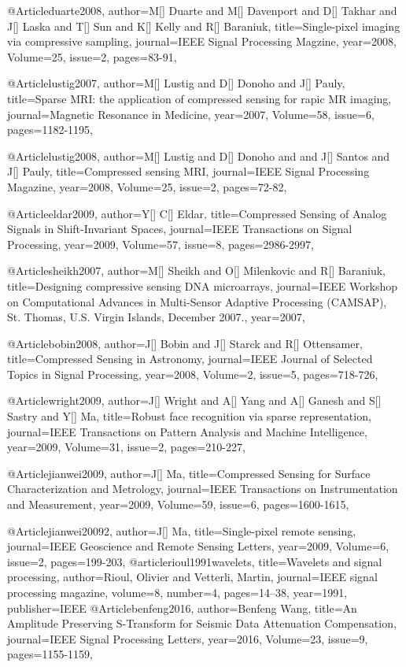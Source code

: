 @Article{duarte2008,
  author={M[] Duarte and M[] Davenport and D[] Takhar and J[] Laska and T[] Sun and K[] Kelly and R[] Baraniuk},
  title={Single-pixel imaging via compressive sampling},
  journal={IEEE Signal Processing Magzine},
  year=2008,
  Volume=25,
  issue=2,
  pages={83-91},
}

@Article{lustig2007,
  author={M[] Lustig and D[] Donoho and J[] Pauly},
  title={Sparse MRI: the application of compressed sensing for rapic MR imaging},
  journal={Magnetic Resonance in Medicine},
  year=2007,
  Volume=58,
  issue=6,
  pages={1182-1195},
}

@Article{lustig2008,
  author={M[] Lustig and D[] Donoho and and J[] Santos and J[] Pauly},
  title={Compressed sensing MRI},
  journal={IEEE Signal Processing Magazine},
  year=2008,
  Volume=25,
  issue=2,
  pages={72-82},
}

@Article{eldar2009,
  author={Y[] C[] Eldar},
  title={Compressed Sensing of Analog Signals in Shift-Invariant Spaces},
  journal={IEEE Transactions on Signal Processing},
  year=2009,
  Volume=57,
  issue=8,
  pages={2986-2997},
}

@Article{sheikh2007,
  author={M[] Sheikh and O[] Milenkovic and R[] Baraniuk},
  title={Designing compressive sensing DNA microarrays},
  journal={IEEE Workshop on Computational Advances in Multi-Sensor Adaptive
Processing (CAMSAP), St. Thomas, U.S. Virgin Islands, December 2007.},
  year=2007,
}

@Article{bobin2008,
  author={J[] Bobin and J[] Starck and R[] Ottensamer},
  title={Compressed Sensing in Astronomy},
  journal={IEEE Journal of Selected Topics in Signal Processing},
  year=2008,
  Volume=2,
  issue=5,
  pages={718-726},
}

@Article{wright2009,
  author={J[] Wright and A[] Yang and A[] Ganesh and S[] Sastry and Y[] Ma},
  title={Robust face recognition via sparse representation},
  journal={IEEE Transactions on Pattern Analysis and Machine Intelligence},
  year=2009,
  Volume=31,
  issue=2,
  pages={210-227},
}

@Article{jianwei2009,
  author={J[] Ma},
  title={Compressed Sensing for Surface Characterization and Metrology},
  journal={IEEE Transactions on Instrumentation and Measurement},
  year=2009,
  Volume=59,
  issue=6,
  pages={1600-1615},
}

@Article{jianwei20092,
  author={J[] Ma},
  title={Single-pixel remote sensing},
  journal={IEEE Geoscience and Remote Sensing Letters},
  year=2009,
  Volume=6,
  issue=2,
  pages={199-203},
}
@article{rioul1991wavelets,
  title={Wavelets and signal processing},
  author={Rioul, Olivier and Vetterli, Martin},
  journal={IEEE signal processing magazine},
  volume={8},
  number={4},
  pages={14--38},
  year={1991},
  publisher={IEEE}
}
@Article{benfeng2016,
  author={Benfeng Wang},
  title={An Amplitude Preserving S-Transform for Seismic Data Attenuation Compensation},
  journal={IEEE Signal Processing Letters},
  year=2016,
  Volume=23,
  issue=9,
  pages={1155-1159},
}

